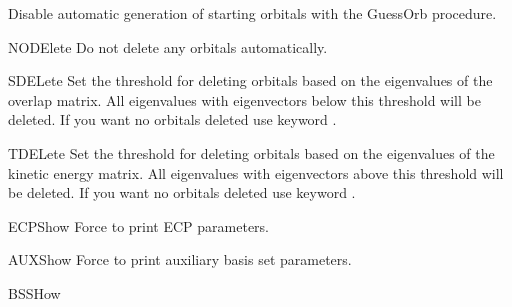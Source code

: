 \begin{keywordlist}
Disable automatic generation of starting orbitals with the GuessOrb procedure.
\item[NODElete]
Do not delete any orbitals automatically.
\item[SDELete]
Set the threshold for deleting orbitals based on the eigenvalues of the overlap matrix.
All eigenvalues with eigenvectors below this threshold will be deleted.
If you want no orbitals deleted use keyword .
\item[TDELete]
Set the threshold for deleting orbitals based on the eigenvalues of the kinetic energy matrix.
All eigenvalues with eigenvectors above this threshold will be deleted.
If you want no orbitals deleted use keyword .
\item[ECPShow]
Force  to print ECP parameters.
\item[AUXShow]
Force  to print auxiliary basis set parameters.
\item[BSSHow]

\end{keywordlist}
